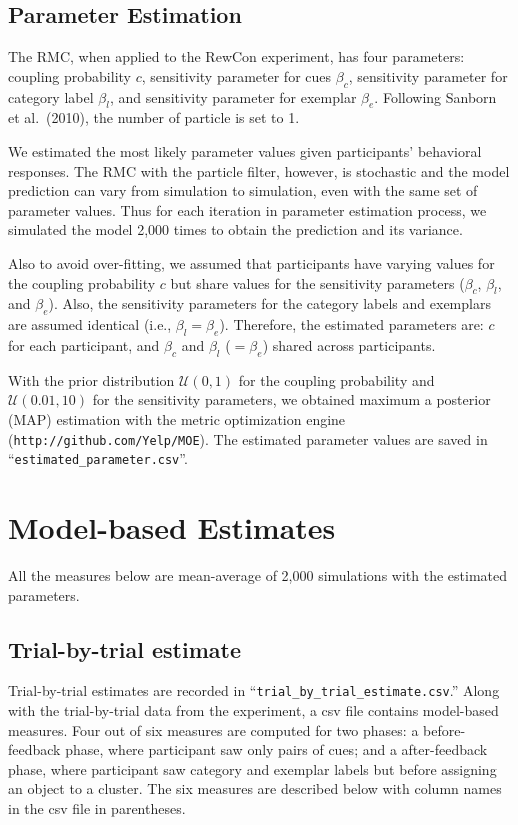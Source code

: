 \documentclass[11pt,a4paper]{article}
\begin{document}
\subsection{Parameter Estimation}

The RMC, when applied to the RewCon experiment, has four parameters: coupling probability $c$,
sensitivity parameter for cues $\beta_{c}$, sensitivity parameter for category label $\beta_{l}$,
and sensitivity parameter for exemplar $\beta_{e}$. Following Sanborn et al.\ (2010), the number of
particle is set to 1.

We estimated the most likely parameter values given participants' behavioral responses. The RMC with
the particle filter, however, is stochastic and the model prediction can vary from simulation to
simulation, even with the same set of parameter values. Thus for each iteration in parameter
estimation process, we simulated the model 2,000 times to obtain the prediction and its variance.

Also to avoid over-fitting, we assumed that participants have varying values for the coupling
probability $c$ but share values for the sensitivity parameters ($\beta_{c}$, $\beta_{l}$, and
$\beta_{e}$). Also, the sensitivity parameters for the category labels and exemplars are assumed
identical (i.e., $\beta_{l} = \beta_{e}$). Therefore, the estimated parameters are: $c$ for each
participant, and $\beta_{c}$ and $\beta_{l}$ ($=\beta_{e}$) shared across participants.

With the prior distribution $\mathcal{U}(0, 1)$ for the coupling probability and $\mathcal{U}(0.01,
10)$ for the sensitivity parameters, we obtained maximum a posterior (MAP) estimation with the
metric optimization engine (\texttt{http://github.com/Yelp/MOE}).  The estimated parameter values
are saved in ``\texttt{estimated\_parameter.csv}''.


\section{Model-based Estimates}

All the measures below are mean-average of 2,000 simulations with the estimated parameters.


\subsection{Trial-by-trial estimate}

Trial-by-trial estimates are recorded in ``\texttt{trial\_by\_trial\_estimate.csv}.'' Along with
the trial-by-trial data from the experiment, a csv file contains model-based measures.  Four out of
six measures are computed for two phases: a before-feedback phase, where participant saw only pairs
of cues; and a after-feedback phase, where participant saw category and exemplar labels but before
assigning an object to a cluster.  The six measures are described below with column names in the csv
file in parentheses.
\end{document}
